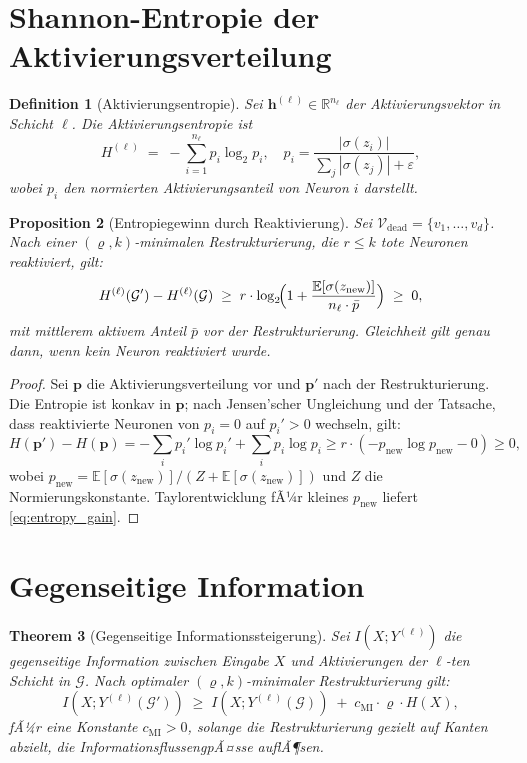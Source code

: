﻿\documentclass[12pt, a4paper, openany]{report}
\newtheorem{theorem}{Theorem}[chapter]
\newtheorem{proposition}[theorem]{Proposition}
\newtheorem{definition}[theorem]{Definition}
\newcommand{\R}{\mathbb{R}}
\newcommand{\E}{\mathbb{E}}
\newcommand{\calG}{\mathcal{G}}
\newcommand{\calV}{\mathcal{V}}
\newcommand{\eps}{\varepsilon}
\begin{document}
\section{Shannon-Entropie der Aktivierungsverteilung}

\begin{definition}[Aktivierungsentropie]
Sei $\bm{h}^{(\ell)} \in \R^{n_\ell}$ der Aktivierungsvektor in Schicht
$\ell$.  Die \emph{Aktivierungsentropie} ist
\[
  H^{(\ell)} \;=\; -\sum_{i=1}^{n_\ell} p_i \log_2 p_i,
  \quad p_i = \frac{|\sigma(z_i)|}{\sum_j |\sigma(z_j)| + \eps},
\]
wobei $p_i$ den normierten Aktivierungsanteil von Neuron $i$ darstellt.
\end{definition}

\begin{proposition}[Entropiegewinn durch Reaktivierung]
\label{prop:entropy}
Sei $\calV_{\mathrm{dead}} = \{v_1, \ldots, v_d\}$.  Nach einer
$(\varrho, k)$-minimalen Restrukturierung, die $r \leq k$ tote Neuronen
reaktiviert, gilt:
\begin{equation}
  \label{eq:entropy_gain}
  H^{(\ell)}(\calG') - H^{(\ell)}(\calG)
  \;\geq\;
  r \cdot \log_2\!\Bigl(1 + \frac{\E[\sigma(z_{\mathrm{new}})]}{n_\ell \cdot \bar{p}}\Bigr)
  \;\geq\; 0,
\end{equation}
mit mittlerem aktivem Anteil $\bar{p}$ vor der Restrukturierung.
Gleichheit gilt genau dann, wenn kein Neuron reaktiviert wurde.
\end{proposition}

\begin{proof}
Sei $\bm{p}$ die Aktivierungsverteilung vor und $\bm{p}'$ nach der
Restrukturierung.  Die Entropie ist konkav in $\bm{p}$; nach
Jensen'scher Ungleichung und der Tatsache, dass reaktivierte Neuronen
von $p_i = 0$ auf $p_i' > 0$ wechseln, gilt:
\[
  H(\bm{p}') - H(\bm{p})
  = -\sum_i p_i' \log p_i' + \sum_i p_i \log p_i
  \geq r \cdot (-p_{\mathrm{new}} \log p_{\mathrm{new}} - 0)
  \geq 0,
\]
wobei $p_{\mathrm{new}} = \E[\sigma(z_{\mathrm{new}})]/(Z + \E[\sigma(z_{\mathrm{new}})])$
und $Z$ die Normierungskonstante.  Taylorentwicklung fÃ¼r kleines
$p_{\mathrm{new}}$ liefert \eqref{eq:entropy_gain}.
\end{proof}

\section{Gegenseitige Information}

\begin{theorem}[Gegenseitige Informationssteigerung]
\label{thm:mutual_info}
Sei $I(X; Y^{(\ell)})$ die gegenseitige Information zwischen Eingabe $X$
und Aktivierungen der $\ell$-ten Schicht in $\calG$.
Nach optimaler $(\varrho, k)$-minimaler Restrukturierung gilt:
\begin{equation}
  \label{eq:mi_gain}
  I(X; Y^{(\ell)}(\calG')) \;\geq\; I(X; Y^{(\ell)}(\calG))
  \;+\; c_{\mathrm{MI}} \cdot \varrho \cdot H(X),
\end{equation}
fÃ¼r eine Konstante $c_{\mathrm{MI}} > 0$, solange die Restrukturierung
gezielt auf Kanten abzielt, die InformationsflussengpÃ¤sse auflÃ¶sen.
\end{theorem}
\end{document}
